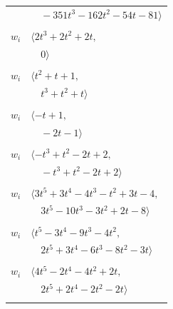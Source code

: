 \documentclass[11pt]{article}
\begin{document}
\begin{longtable}{@{}ll@{}}
 & $\quad -351t^{3}-162t^{2}-54t-81\rangle$\\
\addlinespace[2pt]
\multicolumn{2}{@{}p{0.97\textwidth}@{}}{$i=14$, $D_i=1$, $\rho_{ij}$: $0{:}2, \allowbreak 3{:}1, \allowbreak 4{:}1, \allowbreak 12{:}2, \allowbreak 16{:}1, \allowbreak 18{:}1, \allowbreak 20{:}1$}\\
$w_i$ & $\langle 2t^{3}+2t^{2}+2t,$\\
 & $\quad 0\rangle$\\
\addlinespace[2pt]
\multicolumn{2}{@{}p{0.97\textwidth}@{}}{$i=15$, $D_i=1$, $\rho_{ij}$: $2{:}1, \allowbreak 5{:}2, \allowbreak 7{:}2, \allowbreak 19{:}1$}\\
$w_i$ & $\langle t^{2}+t+1,$\\
 & $\quad t^{3}+t^{2}+t\rangle$\\
\addlinespace[2pt]
\multicolumn{2}{@{}p{0.97\textwidth}@{}}{$i=16$, $D_i=1$, $\rho_{ij}$: $4{:}1, \allowbreak 13{:}1, \allowbreak 14{:}2, \allowbreak 18{:}1$}\\
$w_i$ & $\langle -t+1,$\\
 & $\quad -2t-1\rangle$\\
\addlinespace[2pt]
\multicolumn{2}{@{}p{0.97\textwidth}@{}}{$i=17$, $D_i=1$, $\rho_{ij}$: $4{:}2, \allowbreak 7{:}2, \allowbreak 8{:}2, \allowbreak 9{:}2, \allowbreak 12{:}1$}\\
$w_i$ & $\langle -t^{3}+t^{2}-2t+2,$\\
 & $\quad -t^{3}+t^{2}-2t+2\rangle$\\
\addlinespace[2pt]
\multicolumn{2}{@{}p{0.97\textwidth}@{}}{$i=18$, $D_i=1$, $\rho_{ij}$: $0{:}1, \allowbreak 1{:}1, \allowbreak 3{:}2, \allowbreak 4{:}1, \allowbreak 9{:}2, \allowbreak 12{:}2, \allowbreak 14{:}2, \allowbreak 16{:}2$}\\
$w_i$ & $\langle 3t^{5}+3t^{4}-4t^{3}-t^{2}+3t-4,$\\
 & $\quad 3t^{5}-10t^{3}-3t^{2}+2t-8\rangle$\\
\addlinespace[2pt]
\multicolumn{2}{@{}p{0.97\textwidth}@{}}{$i=19$, $D_i=1$, $\rho_{ij}$: $2{:}1, \allowbreak 4{:}1, \allowbreak 7{:}1, \allowbreak 10{:}1, \allowbreak 11{:}1, \allowbreak 13{:}1, \allowbreak 15{:}2$}\\
$w_i$ & $\langle t^{5}-3t^{4}-9t^{3}-4t^{2},$\\
 & $\quad 2t^{5}+3t^{4}-6t^{3}-8t^{2}-3t\rangle$\\
\addlinespace[2pt]
\multicolumn{2}{@{}p{0.97\textwidth}@{}}{$i=20$, $D_i=1$, $\rho_{ij}$: $1{:}1, \allowbreak 2{:}1, \allowbreak 4{:}2, \allowbreak 6{:}1, \allowbreak 9{:}2, \allowbreak 10{:}1, \allowbreak 13{:}2, \allowbreak 14{:}2$}\\
$w_i$ & $\langle 4t^{5}-2t^{4}-4t^{2}+2t,$\\
 & $\quad 2t^{5}+2t^{4}-2t^{2}-2t\rangle$\\
\addlinespace[2pt]
\end{longtable}
\endgroup
\end{document}
